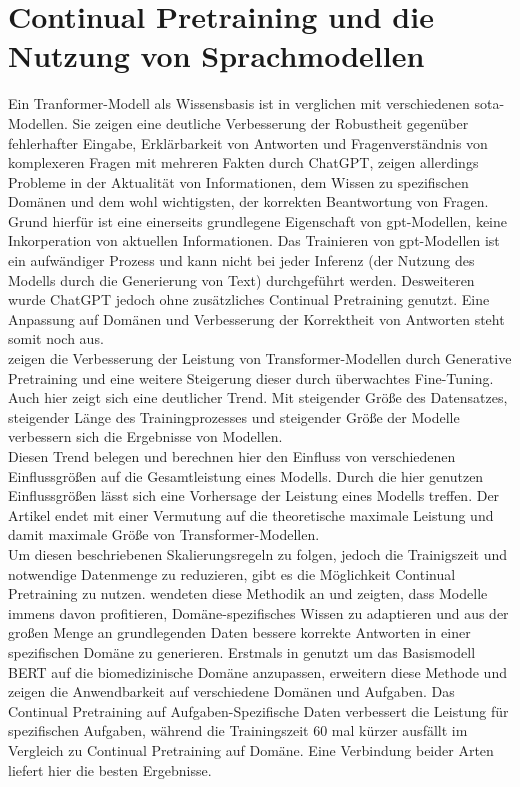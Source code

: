 \section{Continual Pretraining und die Nutzung von Sprachmodellen}

Ein Tranformer-Modell als Wissensbasis ist in \citet{chatgpt_qas} verglichen mit verschiedenen \ac{sota}-Modellen. 
Sie zeigen eine deutliche Verbesserung der Robustheit gegenüber fehlerhafter Eingabe, Erklärbarkeit von Antworten und Fragenverständnis von komplexeren Fragen mit mehreren Fakten durch ChatGPT, zeigen allerdings Probleme in der Aktualität von Informationen, dem Wissen zu spezifischen Domänen und dem wohl wichtigsten, der korrekten Beantwortung von Fragen. 
Grund hierfür ist eine einerseits grundlegene Eigenschaft von \ac{gpt}-Modellen, keine Inkorperation von aktuellen Informationen. 
Das Trainieren von \ac{gpt}-Modellen ist ein aufwändiger Prozess und kann nicht bei jeder Inferenz (der Nutzung des Modells durch die Generierung von Text) durchgeführt werden. 
Desweiteren wurde ChatGPT jedoch ohne zusätzliches Continual Pretraining genutzt.
Eine Anpassung auf Domänen und Verbesserung der Korrektheit von Antworten steht somit noch aus.\\

\citet{improve_language} zeigen die Verbesserung der Leistung von Transformer-Modellen durch Generative Pretraining und eine weitere Steigerung dieser durch überwachtes Fine-Tuning.
Auch hier zeigt sich eine deutlicher Trend. Mit steigender Größe des Datensatzes, steigender Länge des Trainingprozesses und steigender Größe der Modelle verbessern sich die Ergebnisse von Modellen.\\

Diesen Trend belegen \citet{scaling_laws} und berechnen hier den Einfluss von verschiedenen Einflussgrößen auf die Gesamtleistung eines Modells. Durch die hier genutzen Einflussgrößen lässt sich eine Vorhersage der Leistung eines Modells treffen. 
Der Artikel endet mit einer Vermutung auf die theoretische maximale Leistung und damit maximale Größe von Transformer-Modellen.\\

Um diesen beschriebenen Skalierungsregeln zu folgen, jedoch die Trainigszeit und notwendige Datenmenge zu reduzieren, gibt es die Möglichkeit Continual Pretraining zu nutzen. 
\citet{dont_stop_pretraining} wendeten diese Methodik an und zeigten, dass Modelle immens davon profitieren, Domäne-spezifisches Wissen zu adaptieren und aus der großen Menge an grundlegenden Daten bessere korrekte Antworten in einer spezifischen Domäne zu generieren. 
Erstmals in \citet{biobert} genutzt um das Basismodell BERT auf die biomedizinische Domäne anzupassen, erweitern \citet{dont_stop_pretraining} diese Methode und zeigen die Anwendbarkeit auf verschiedene Domänen und Aufgaben. 
Das Continual Pretraining auf Aufgaben-Spezifische Daten verbessert die Leistung für spezifischen Aufgaben, während die Trainingszeit 60 mal kürzer ausfällt im Vergleich zu Continual Pretraining auf Domäne. 
Eine Verbindung beider Arten liefert hier die besten Ergebnisse.\\

